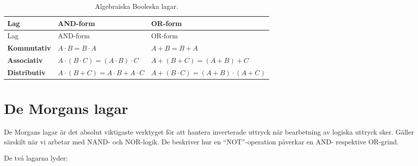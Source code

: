 \documentclass[
  swedish,
  letterpaper,
  oneside,
  openany]{book}
\begin{document}
\begin{longtable}[]{@{}
  >{\raggedright\arraybackslash}p{}
  >{\raggedright\arraybackslash}p{}
  >{\raggedright\arraybackslash}p{}@{}}
\caption{Algebraiska Booleska
lagar.}\label{tbl-booleska_algebraiska_lagar}\tabularnewline
\toprule\noalign{}
\begin{minipage}[b]{\linewidth}\raggedright
Lag
\end{minipage} & \begin{minipage}[b]{\linewidth}\raggedright
AND-form
\end{minipage} & \begin{minipage}[b]{\linewidth}\raggedright
OR-form
\end{minipage} \\
\midrule\noalign{}
\endfirsthead
\toprule\noalign{}
\begin{minipage}[b]{\linewidth}\raggedright
Lag
\end{minipage} & \begin{minipage}[b]{\linewidth}\raggedright
AND-form
\end{minipage} & \begin{minipage}[b]{\linewidth}\raggedright
OR-form
\end{minipage} \\
\midrule\noalign{}
\endhead
\bottomrule\noalign{}
\endlastfoot
\textbf{Kommutativ} & \(A \cdot B = B \cdot A\) & \(A + B = B + A\) \\
\textbf{Associativ} & \(A \cdot (B \cdot C) = (A \cdot B) \cdot C\) &
\(A + (B + C) = (A + B) + C\) \\
\textbf{Distributiv} & \(A \cdot (B + C) = A \cdot B + A \cdot C\) &
\(A + (B \cdot C) = (A + B) \cdot (A + C)\) \\
\end{longtable}

\section{De Morgans lagar}\label{de-morgans-lagar}

De Morgans lagar är det absolut viktigaste verktyget för att hantera
inverterade uttryck när bearbetning av logiska uttryck sker. Gäller
särskilt när vi arbetar med NAND- och NOR-logik. De beskriver hur en
``NOT''-operation påverkar en AND- respektive OR-grind.

De två lagarna lyder:
\end{document}
